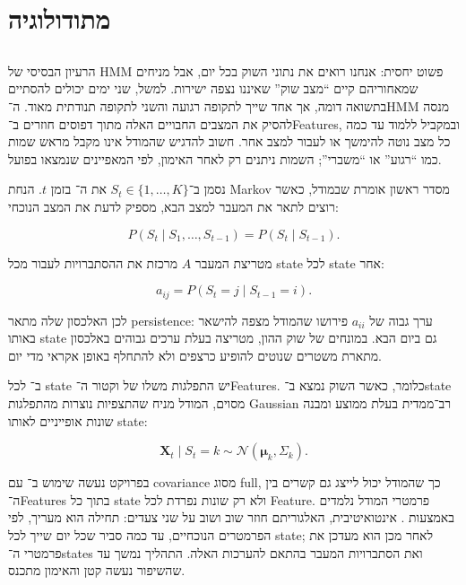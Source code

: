 \section{מתודולוגיה}

\subsection{}

הרעיון הבסיסי של HMM פשוט יחסית: אנחנו רואים את נתוני השוק בכל יום, אבל מניחים שמאחוריהם קיים ``מצב שוק'' שאיננו נצפה ישירות. למשל, שני ימים יכולים להסתיים בתשואה דומה, אך אחד שייך לתקופה רגועה והשני לתקופה תנודתית מאוד. ה־HMM מנסה להסיק את המצבים החבויים האלה מתוך דפוסים חוזרים ב־Features, ובמקביל ללמוד עד כמה כל מצב נוטה להימשך או לעבור למצב אחר. חשוב להדגיש שהמודל אינו מקבל מראש שמות כמו ``רגוע'' או ``משברי''; השמות ניתנים רק לאחר האימון, לפי המאפיינים שנמצאו בפועל.

נסמן ב־\(S_t\in\{1,\ldots,K\}\) את ה־ בזמן \(t\). הנחת Markov מסדר ראשון אומרת שבמודל, כאשר רוצים לתאר את המעבר למצב הבא, מספיק לדעת את המצב הנוכחי:

\begin{equation}
P(S_t\mid S_1,\ldots,S_{t-1}) = P(S_t\mid S_{t-1}).
\end{equation}

מטריצת המעבר \(A\) מרכזת את ההסתברויות לעבור מכל state לכל state אחר:

\begin{equation}
a_{ij}=P(S_t=j\mid S_{t-1}=i).
\end{equation}

לכן האלכסון שלה מתאר persistence: ערך גבוה של \(a_{ii}\) פירושו שהמודל מצפה להישאר באותו state גם ביום הבא. במונחים של שוק ההון, מטריצה בעלת ערכים גבוהים באלכסון מתארת משטרים שנוטים להופיע כרצפים ולא להתחלף באופן אקראי מדי יום.

ב־ לכל state יש התפלגות משלו של וקטור ה־Features. כלומר, כאשר השוק נמצא ב־state מסוים, המודל מניח שהתצפיות נוצרות מהתפלגות Gaussian רב־ממדית בעלת ממוצע ומבנה שונות אופייניים לאותו state:

\begin{equation}
\mathbf{X}_t\mid S_t=k \sim \mathcal{N}(\boldsymbol{\mu}_k,\Sigma_k).
\end{equation}

בפרויקט נעשה שימוש ב־ \cite{hmmlearn} עם covariance מסוג full, כך שהמודל יכול לייצג גם קשרים בין ה־Features בתוך כל state ולא רק שונות נפרדת לכל Feature. פרמטרי המודל נלמדים באמצעות  \cite{baum1970maximization}. אינטואיטיבית, האלגוריתם חוזר שוב ושוב על שני צעדים: תחילה הוא מעריך, לפי הפרמטרים הנוכחיים, עד כמה סביר שכל יום שייך לכל state; לאחר מכן הוא מעדכן את פרמטרי ה־states ואת הסתברויות המעבר בהתאם להערכות האלה. התהליך נמשך עד שהשיפור נעשה קטן והאימון מתכנס.

